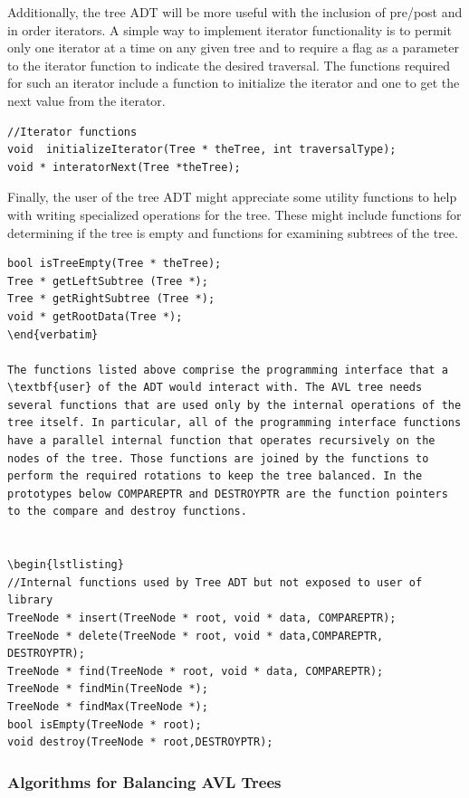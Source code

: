 Additionally, the tree ADT will be more useful with the inclusion of pre/post and in order iterators. A simple way to implement iterator functionality is to permit only one iterator at a time on any given tree and to require a flag as a parameter to the iterator function to indicate the desired traversal. The functions required for such an iterator include a function to initialize the iterator and one to get the next value from the iterator.

\begin{lstlisting}
//Iterator functions
void  initializeIterator(Tree * theTree, int traversalType);
void * interatorNext(Tree *theTree);
\end{lstlisting}

Finally, the user of the tree ADT might appreciate some utility functions to help with writing specialized operations for the tree. These might include functions for determining if the tree is empty and functions for examining subtrees of the tree.

\begin{lstlisting}
bool isTreeEmpty(Tree * theTree);
Tree * getLeftSubtree (Tree *);
Tree * getRightSubtree (Tree *);
void * getRootData(Tree *);
\end{verbatim}

The functions listed above comprise the programming interface that a \textbf{user} of the ADT would interact with. The AVL tree needs several functions that are used only by the internal operations of the tree itself. In particular, all of the programming interface functions have a parallel internal function that operates recursively on the nodes of the tree. Those functions are joined by the functions to perform the required rotations to keep the tree balanced. In the prototypes below COMPAREPTR and DESTROYPTR are the function pointers to the compare and destroy functions.


\begin{lstlisting}
//Internal functions used by Tree ADT but not exposed to user of library
TreeNode * insert(TreeNode * root, void * data, COMPAREPTR);
TreeNode * delete(TreeNode * root, void * data,COMPAREPTR, DESTROYPTR);
TreeNode * find(TreeNode * root, void * data, COMPAREPTR);
TreeNode * findMin(TreeNode *);
TreeNode * findMax(TreeNode *);
bool isEmpty(TreeNode * root);
void destroy(TreeNode * root,DESTROYPTR);
 \end{lstlisting}
 
\subsubsection{Algorithms for Balancing AVL Trees}


